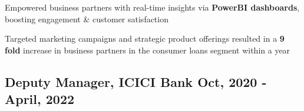 \documentclass[]{resume}
\begin{document}
\begin{adjustwidth}{0.5cm}{0cm}
    \pt Empowered business partners with real-time insights via \textbf{PowerBI dashboards}, boosting engagement \& customer satisfaction



    \pt Targeted marketing campaigns and strategic product offerings resulted in a \textbf{9 fold} increase in business partners in the consumer loans segment within a year
    
    \sectionsep
\end{adjustwidth}


\subsection{Deputy Manager, ICICI Bank \hfill \normalfont Oct, 2020 - April, 2022}
\end{document}
